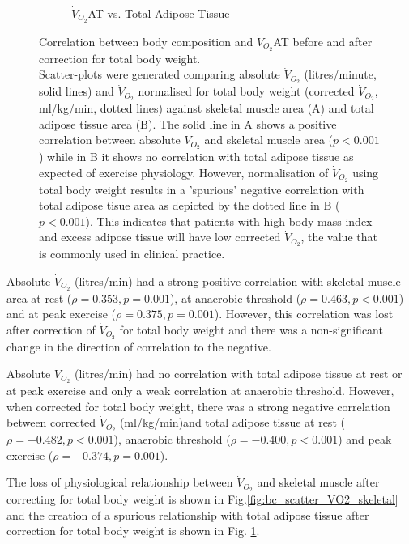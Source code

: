 \begin{figure}[htb]
\begin{subfigure}[b]{0.45\textwidth}
		\caption{$\dot{V}_{O_2}$AT vs. 
Total Adipose Tissue}
		\label{fig:bc_scatter_VO2_TAT}
	\end{subfigure}
	\caption[Correlation between body composition and $\dot{V}_{O_2}$AT before and after correction for total body weight.]
	{Correlation between body composition and $\dot{V}_{O_2}$AT before and after correction for total body weight.
	\\ Scatter-plots were generated comparing absolute $\dot{V}_{O_2}$ (litres/minute, solid lines) and $\dot{V}_{O_2}$ normalised for total body weight (corrected $\dot{V}_{O_2}$, ml/kg/min, dotted lines) against skeletal muscle area (A) and total adipose tissue area (B). The solid line in A shows a positive correlation between absolute $\dot{V}_{O_2}$ and skeletal muscle area ($p<0.001$) while in B it shows no correlation with total adipose tissue as expected of exercise physiology. However, normalisation of $\dot{V}_{O_2}$ using total body weight results in a 'spurious' negative correlation with total adipose tisue area as depicted by the dotted line in B ($p<0.001$). This indicates that patients with high body mass index and excess adipose tissue will have low corrected $\dot{V}_{O_2}$, the value that is commonly used in clinical practice.}	
	\label{fig:bc_scatter_VO2_bodycomp_reversal}
\end{figure}

Absolute $\dot{V}_{O_2}$ (litres/min) had a strong positive correlation with skeletal muscle area at rest ($\rho = 0.353, p = 0.001$), at anaerobic threshold ($\rho = 0.463, p<0.001$) and at peak exercise ($\rho = 0.375, p = 0.001$). 
However, this correlation was lost after correction of $\dot{V}_{O_2}$ for total body weight and there was a non-significant change in the direction of correlation to the negative.

Absolute $\dot{V}_{O_2}$ (litres/min) had no correlation with total adipose tissue at rest or at peak exercise and only a weak correlation at anaerobic threshold. 
However, when corrected for total body weight, there was a strong negative correlation between corrected $\dot{V}_{O_2}$ (ml/kg/min)and total adipose tissue at rest ($\rho = -0.482, p<0.001$), anaerobic threshold ($\rho = -0.400, p<0.001$) and peak exercise ($\rho = -0.374, p = 0.001$).

The loss of physiological relationship between $\dot{V}_{O_2}$ and skeletal muscle after correcting for total body weight is shown in Fig.\ref{fig:bc_scatter_VO2_skeletal} and the creation of a spurious relationship with total adipose tissue after correction for total body weight is shown in Fig. \ref{fig:bc_scatter_VO2_TAT}.

